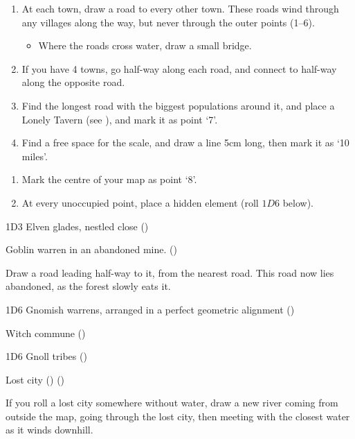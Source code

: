 \begin{multicols}{2}
\begin{enumerate}
  \item
  At each town, draw a road to every other town.
  These roads wind through any villages along the way, but never through the outer points (1--6).
  \begin{itemize}
    \item
    Where the roads cross water, draw a small bridge.
  \end{itemize}
  \item
  If you have 4 towns, go half-way along each road, and connect to half-way along the opposite road.
  \item
  Find the longest road with the biggest populations around it, and place a Lonely Tavern (see ), and mark it as point `7'.
  \item
  Find a free space for the scale, and draw a line 5cm long, then mark it as `10 miles'.
\end{enumerate}

\label{mapOddities}

\begin{enumerate}
  \item
  Mark the centre of your map as point `8'.
  \item
  At every unoccupied point, place a hidden element (roll $1D6$ below).
\end{enumerate}

\begin{multicols}{2}
\begin{dlist}\raggedright
\item
  1D3 Elven glades, nestled close (\El)
\item
  Goblin warren in an abandoned mine. (\N)

  Draw a road leading half-way to it, from the nearest road.
  This road now lies abandoned, as the forest slowly eats it.
\item
  1D6 Gnomish warrens, arranged in a perfect geometric alignment (\Gn)
  \columnbreak
\item
  Witch commune (\Hu)
\item
  1D6 Gnoll tribes (\Nl)
\item
  Lost city (\D) ()

  If you roll a lost city somewhere without water, draw a new river coming from outside the map, going through the lost city, then meeting with the closest water as it winds downhill.
\end{dlist}
\end{multicols}


\end{multicols}

